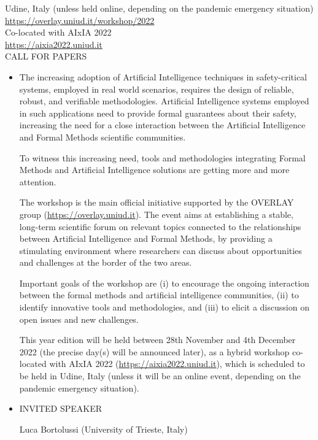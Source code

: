 \documentclass[prodmode,acmtecs]{acmsmall} %
\begin{document}
  Udine, Italy (unless held online, depending on the pandemic emergency situation)\\ 
  \href{https://overlay.uniud.it/workshop/2022}{https://overlay.uniud.it/workshop/2022}\\ 
  Co-located with AIxIA 2022\\ 
  \href{https://aixia2022.uniud.it}{https://aixia2022.uniud.it}\\ 
CALL FOR PAPERS 

\begin{itemize}\item  The increasing adoption of Artificial Intelligence techniques in safety-critical systems, employed in real world scenarios, requires the design of reliable, robust, and verifiable methodologies. Artificial Intelligence systems employed in such applications need to provide formal guarantees about their safety, increasing the need for a close interaction between the Artificial Intelligence and Formal Methods scientific communities. 
 
  To witness this increasing need, tools and methodologies integrating Formal Methods and Artificial Intelligence solutions are getting more and more attention. 
 
  The workshop is the main official initiative supported by the OVERLAY group (\href{https://overlay.uniud.it}{https://overlay.uniud.it}). The event aims at establishing a stable, long-term scientific forum on relevant topics connected to the relationships between Artificial Intelligence and Formal Methods, by providing a stimulating environment where researchers can discuss about opportunities and challenges at the border of the two areas. 
 
  Important goals of the workshop are (i) to encourage the ongoing interaction between the formal methods and artificial intelligence communities, (ii) to identify innovative tools and methodologies, and (iii) to elicit a discussion on open issues and new challenges. 
 
  This year edition will be held between 28th November and 4th December 2022 (the precise day(s) will be announced later), as a hybrid workshop co-located with AIxIA 2022 (\href{https://aixia2022.uniud.it}{https://aixia2022.uniud.it}), which is scheduled to be held in Udine, Italy (unless it will be an online event, depending on the pandemic emergency situation). 
 
\item  INVITED SPEAKER  
 
  Luca Bortolussi (University of Trieste, Italy) 
 

\end{itemize}
\end{document}
